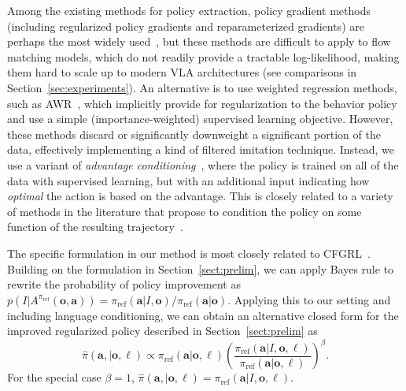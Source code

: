 \documentclass[conference]{IEEEtran}
\newcommand{\ba}{\mathbf{a}}
\newcommand{\bo}{\mathbf{o}}
\newcommand{\lang}{\ell}
\newcommand{\piref}{\pi_\text{ref}}
\begin{document}
Among the existing methods for policy extraction, policy gradient methods (including regularized policy gradients and reparameterized gradients) are perhaps the most widely used~\citep{schulman2017proximal, haarnoja2018sac}, but these methods are difficult to apply to flow matching models, which do not readily provide a tractable log-likelihood, making them hard to scale up to modern VLA architectures (see comparisons in Section~\ref{sec:experiments}). An alternative is to use weighted regression methods, such as AWR~\citep{peng2019advantage,wangCRR,kostrikov2022offline}, which implicitly provide for regularization to the behavior policy and use a simple (importance-weighted) supervised learning objective. However, these methods discard or significantly downweight a significant portion of the data, effectively implementing a kind of filtered imitation technique. Instead, we use a variant of \emph{advantage conditioning}~\citep{Kumar2019RewardConditionedPolicies}, where the policy is trained on all of the data with supervised learning, but with an additional input indicating how \emph{optimal} the action is based on the advantage. This is closely related to a variety of methods in the literature that propose to condition the policy on some function of the resulting trajectory~\citep{Schmidhuber2019UpsideDownRL,Brandfonbrener2022RCSL}.


The specific formulation in our method is most closely related to CFGRL~\citep{Frans2025DiffusionGuidance}. Building on the formulation in Section~\ref{sect:prelim}, we can apply Bayes rule to rewrite the probability of policy improvement  as $p(I | A^{\piref}(\bo, \ba)) = \pi_{\text{ref}}(\ba | I, \bo) / \pi_{\text{ref}}(\ba | \bo)$. Applying this to our setting and including language conditioning, we can obtain an alternative closed form for the improved regularized policy described in Section~\ref{sect:prelim} as
\begin{equation}
      \hat{\pi}(\ba,  | \bo, \lang) \propto \piref(\ba | \bo, \lang) \left( \frac{\piref(\ba | I, \bo, \lang)}{\piref(\ba | \bo, \lang)} \right)^\beta.
\label{eq:improved_policy}
\end{equation}
For the special case $\beta = 1$, $\hat{\pi}(\ba,  | \bo, \lang) = \piref(\ba | I, \bo, \lang)$.
\end{document}
